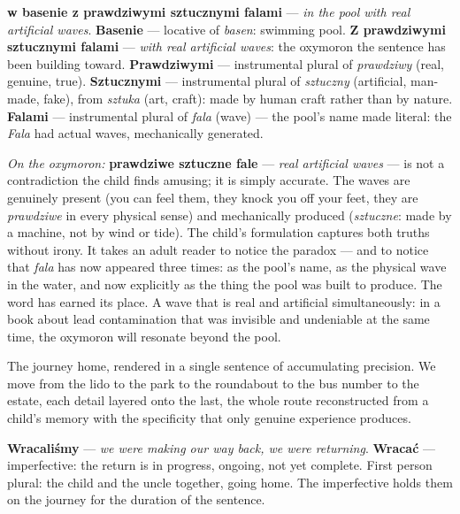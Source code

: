 \textbf{w basenie z prawdziwymi sztucznymi falami}
--- \textit{in the pool with real artificial waves}.
\textbf{Basenie} --- locative of \textit{basen}:
swimming pool. \textbf{Z prawdziwymi sztucznymi
falami} --- \textit{with real artificial waves}:
the oxymoron the sentence has been building toward.
\textbf{Prawdziwymi} --- instrumental plural of
\textit{prawdziwy} (real, genuine, true).
\textbf{Sztucznymi} --- instrumental plural of
\textit{sztuczny} (artificial, man-made, fake),
from \textit{sztuka} (art, craft): made by human
craft rather than by nature. \textbf{Falami} ---
instrumental plural of \textit{fala} (wave) ---
the pool's name made literal: the \textit{Fala}
had actual waves, mechanically generated.

\medskip
\noindent\textit{On the oxymoron:} \textbf{prawdziwe
sztuczne fale} --- \textit{real artificial waves}
--- is not a contradiction the child finds amusing;
it is simply accurate. The waves are genuinely
present (you can feel them, they knock you off
your feet, they are \textit{prawdziwe} in every
physical sense) and mechanically produced
(\textit{sztuczne}: made by a machine, not by
wind or tide). The child's formulation captures
both truths without irony. It takes an adult
reader to notice the paradox --- and to notice
that \textit{fala} has now appeared three times:
as the pool's name, as the physical wave in the
water, and now explicitly as the thing the pool
was built to produce. The word has earned its
place. A wave that is real and artificial
simultaneously: in a book about lead contamination
that was invisible and undeniable at the same time,
the oxymoron will resonate beyond the pool.



The journey home, rendered in a single sentence of
accumulating precision. We move from the lido to
the park to the roundabout to the bus number to the
estate, each detail layered onto the last, the whole
route reconstructed from a child's memory with the
specificity that only genuine experience produces.

\textbf{Wracaliśmy} --- \textit{we were making our
way back, we were returning}. \textbf{Wracać} ---
imperfective: the return is in progress, ongoing,
not yet complete. First person plural: the child
and the uncle together, going home. The imperfective
holds them on the journey for the duration of the
sentence.

